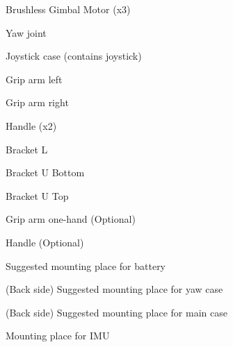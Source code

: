 \begin{multicols}{2}
\begin{enumerate}[label={[\arabic*]}] \itemsep -1pt
\item Brushless Gimbal Motor (x3)\\
\item Yaw joint\\
\item Joystick case (contains joystick)\\
\item Grip arm left\\
\item Grip arm right\\
\item Handle (x2)\\
\item Bracket L\\
\item Bracket U Bottom\\
\item Bracket U Top\\
\item Grip arm one-hand (Optional)\\
\item Handle (Optional)\\
\item Suggested mounting place for battery\\
\item (Back side) Suggested mounting place for yaw case\\
\item (Back side) Suggested mounting place for main case\\
\item Mounting place for IMU\\
\end{enumerate}
\end{multicols}
